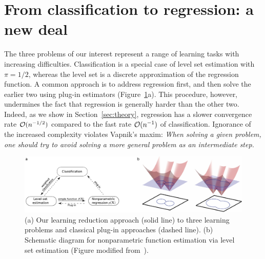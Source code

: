 \documentclass[12pt]{article}
\begin{document}




\section{From classification to regression: a new deal}\label{sec:idea}
The three problems of our interest represent a range of learning tasks with increasing difficulties. Classification is a special case of level set estimation with $\pi=1/2$, whereas the level set is a discrete approximation of the regression function. A common approach is to address regression first, and then solve the earlier two using plug-in estimators (Figure~\ref{fig:diagram}a). This procedure, however, undermines the fact that regression is generally harder than the other two. Indeed, as we show in Section~\ref{sec:theory}, regression has a slower convergence rate $\mathcal{O}(n^{-1/2})$ compared to the fast rate $\mathcal{O}(n^{-1})$ of classification. 
Ignorance of the increased complexity violates Vapnik’s maxim: \emph{When solving a given problem, one should try to avoid solving a more general problem as an intermediate step.} 

\begin{figure}
\includegraphics[width=16cm]{level.pdf}
\caption{(a) Our learning reduction approach (solid line) to three learning problems and classical plug-in approaches (dashed line). (b) Schematic diagram for nonparametric function estimation via level set estimation (Figure modified from~\cite{gibou2018review}).}\label{fig:diagram}
\end{figure}
\end{document}
